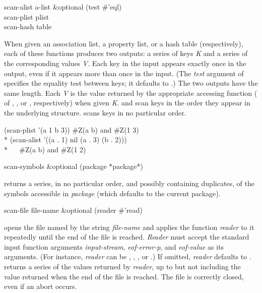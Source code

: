 \begin{defun}[Function]
scan-alist a-list &optional (test \#'eql) \\
scan-plist plist \\
scan-hash table

When given an association list, a property list, or a hash table
(respectively), each of these functions produces two outputs:  a series of keys
{\it K} and a series of the corresponding values {\it V}.  Each key in the
input appears exactly once in the output, even if it appears more than once
in the input.  (The {\it test} argument of  specifies the
equality test between keys; it defaults to .)
The two outputs have the same length.  Each
{\it V} is the value returned by the appropriate accessing function
( of , , or , respectively)
when given {\it K}.   and  scan keys
in the order
they appear in the underlying structure.   scans keys in no
particular order.
\begin{lisp}
(scan-plist '(a 1 b 3)) {\EV} \#Z(a b) {\rm and} \#Z(1 3) \\*
(scan-alist '((a . 1) nil (a . 3) (b . 2))) \\*
~~{\EV} \#Z(a b) {\rm and} \#Z(1 2)
\end{lisp}
\end{defun}

\begin{defun}[Function]
scan-symbols &optional (package *package*)

 returns a series, in no particular order, and possibly
containing duplicates, of the symbols accessible in {\it package} (which
defaults to the current package).
\end{defun}

\begin{defun}[Function]
scan-file file-name &optional (reader \#'read)

 opens the file named by the string {\it file-name}
and applies the function {\it reader} to it repeatedly until the end of the
file is reached.  {\it Reader} must accept the standard input function
arguments {\it input-stream}, {\it eof-error-p}, and {\it eof-value} as its
arguments.  (For instance, {\it reader} can be ,
, , or
.) If omitted, {\it reader} defaults to .
 returns a series of the values returned
by {\it reader}, up to but not including the value returned
when the end of the file is reached.  The
file is correctly closed, even if an abort occurs. \end{defun}

